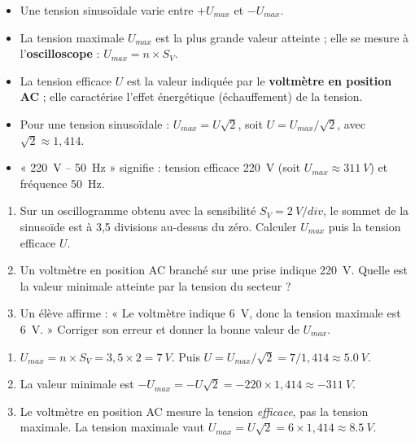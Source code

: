 \documentclass[11pt]{article}
\newcommand{\cle}[1]{{\popxbold\color{popdark}#1}}
\begin{document}
\begin{aretenir}
\begin{itemize}
\item Une tension sinusoïdale varie entre $+U_{max}$ et $-U_{max}$.
\item La \cle{tension maximale} $U_{max}$ est la plus grande valeur atteinte ; elle se mesure à l'\textbf{oscilloscope} : $U_{max} = n \times S_V$.
\item La \cle{tension efficace} $U$ est la valeur indiquée par le \textbf{voltmètre en position AC} ; elle caractérise l'effet énergétique (échauffement) de la tension.
\item Pour une tension sinusoïdale : $U_{max} = U\sqrt{2}$, soit $U = U_{max}/\sqrt{2}$, avec $\sqrt{2} \approx 1,414$.
\item « \SI{220}{V} -- \SI{50}{Hz} » signifie : tension efficace \SI{220}{V} (soit $U_{max} \approx \SI{311}{V}$) et fréquence \SI{50}{Hz}.
\end{itemize}
\end{aretenir}

\begin{exercice}
\begin{enumerate}
\item Sur un oscillogramme obtenu avec la sensibilité $S_V = \SI{2}{V/div}$, le sommet de la sinusoïde est à 3,5 divisions au-dessus du zéro. Calculer $U_{max}$ puis la tension efficace $U$.
\item Un voltmètre en position AC branché sur une prise indique \SI{220}{V}. Quelle est la valeur minimale atteinte par la tension du secteur ?
\item Un élève affirme : « Le voltmètre indique \SI{6}{V}, donc la tension maximale est \SI{6}{V}. » Corriger son erreur et donner la bonne valeur de $U_{max}$.
\end{enumerate}
\end{exercice}

\begin{corrige}
\begin{enumerate}
\item $U_{max} = n \times S_V = 3,5 \times 2 = \SI{7}{V}$. Puis $U = U_{max}/\sqrt{2} = 7/1,414 \approx \SI{5,0}{V}$.
\item La valeur minimale est $-U_{max} = -U\sqrt{2} = -220 \times 1,414 \approx -\SI{311}{V}$.
\item Le voltmètre en position AC mesure la tension \emph{efficace}, pas la tension maximale. La tension maximale vaut $U_{max} = U\sqrt{2} = 6 \times 1,414 \approx \SI{8,5}{V}$.
\end{enumerate}
\end{corrige}
\end{document}
